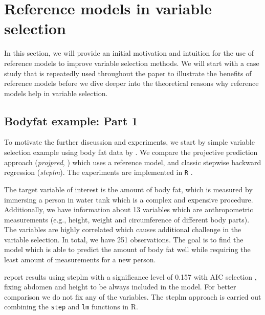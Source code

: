 \documentclass[a4]{article}
\let\rmarkdownfootnote\footnote%
\def\footnote{\protect\rmarkdownfootnote}
\theoremstyle{definition}
\begin{document}
\section{Reference models in variable selection}
\label{ref-intro}

In this section, we will provide an initial motivation and intuition 
for the use of reference models to improve variable selection methods.
We will start with a case study that is repeatedly used throughout
the paper to illustrate the benefits of reference models before we dive deeper
into the theoretical reasons why reference models help in variable selection.

\subsection{Bodyfat example: Part 1}
\label{bodyfat-1}

To motivate the further discussion and experiments, we start by simple
variable selection example using body fat data by \citet{johnson1996fitting}.
We compare the projective prediction approach (\emph{projpred},
\citet{paper:projpred}) which uses a reference model, and classic
stepwise backward regression (\emph{steplm}).
The experiments are implemented in \texttt{R} \citep{Rcore2018}.

The target variable of interest is the amount of body fat, which is
measured by immersing a person in water tank which is a complex and
expensive procedure. Additionally, we have information about 13
variables which are anthropometric measurements (e.g., height, weight
and circumference of different body parts). The
variables are highly correlated which causes additional
challenge in the variable selection. In total, we have 251
observations. The goal is to find the model which is able to predict
the amount of body fat well while requiring the least amount of
measurements for a new person.

\cite{paper:bodyfat} report results using steplm with a significance
level of 0.157 with AIC selection \citep{akaike1974new}, fixing
abdomen and height to be always included in the model. For better
comparison we do not fix any of the variables.  The steplm approach is
carried out combining the \texttt{step} and \texttt{lm} functions in R.
\end{document}
